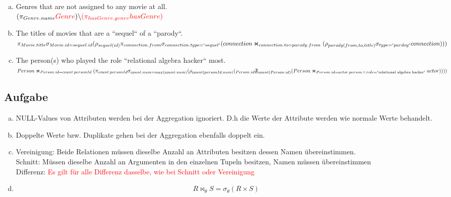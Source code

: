 \documentclass[11pt,a4paper,DIV=9]{scrartcl}
\newcounter{temp}
\newcommand{\aufgabe}[1]{
  \setcounter{temp}{\value{subsection}}
  \setcounter{subsection}{#1}
  \addtocounter{subsection}{-1}
  \subsection{Aufgabe}
  \setcounter{subsection}{\value{temp}}
}
\begin{document}
\begin{enumerate}[a)]
    \item Genres that are not assigned to any movie at all. \hfill \\
      $
      (\pi _{Genre.name} \textcolor{red}{Genre}) \\
      \backslash
        \\
        \textcolor{red}{(\pi _{hasGenre.genre}hasGenre)}
      $
    \item The titles of movies that are a ``sequel`` of a ``parody``. \\
      $\pi_{Movie.title} \\
      \sigma_{Movie.id = sequel.id} \\
      (\rho_{sequel(id)}\\
      \pi_{connection.from}\sigma_{connection.type='sequel'}\\
      (connection \Join_{connection.to = parody.from} \\ 
        (\rho_{parody(from,to,title)}\sigma_{type='pardoy'}connection)\\
      ))$
    \item The person(s) who played the role ``relational algebra hacker`` most.\hfill\\
      $
      Person \Join_{Person.id = count.personId}(\pi_{count.personId}\\
      \sigma_{count.num=max(count.num)}\\
      (
        \rho_{count(personId,num)} (\\
          _{Person.id}\mathfrak{F}_{count(Person.id)}(\\
          Person\Join_{Person.id = actor.person \,\wedge\, role = '\textrm{relational algebra hacker}'}actor\\
          )\\
        )\\
      ))
      $
  \end{enumerate}
\aufgabe{2}
 \begin{enumerate}[a)]
   \item NULL-Values von Attributen werden bei der Aggregation ignoriert. D.h die Werte der Attribute werden wie normale Werte behandelt.
   \item Doppelte Werte bzw. Duplikate gehen bei der Aggregation ebenfalls doppelt ein.
   \item Vereinigung: Beide Relationen m\"ussen dieselbe Anzahl an Attributen besitzen dessen Namen \"ubereinstimmen. 
   \\ Schnitt: M\"ussen dieselbe Anzahl an Argumenten in den einzelnen Tupeln besitzen, Namen m\"ussen \"ubereinstimmen
   \\ Differenz: \textcolor{red}{Es gilt f\"ur alle Differenz dasselbe, wie bei Schnitt oder Vereinigung}

   \item \begin{displaymath} R \Join _{\theta} S =  \sigma _{\theta} (R \times S) \end{displaymath}
 \end{enumerate}
\end{document}
